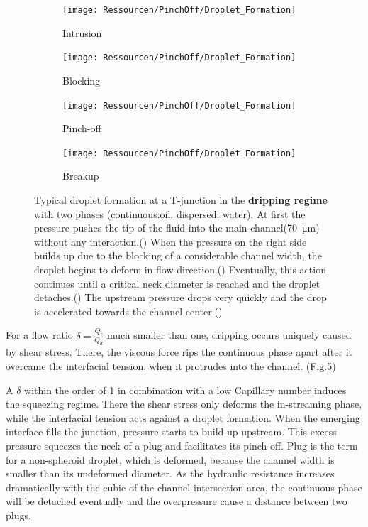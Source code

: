 \begin{figure}[htb]
	\begin{subfigure}{0.49\linewidth}
		\centering
		\texttt{[image: Ressourcen/PinchOff/Droplet\_Formation]}
		\caption{Intrusion}
		\label{fig:fluidics:droplet:dripping:intrusion}
	\end{subfigure}
	\hfil
	\begin{subfigure}{0.49\linewidth}
		\centering
		\texttt{[image: Ressourcen/PinchOff/Droplet\_Formation]}
		\caption{Blocking}
		\label{fig:fluidics:droplet:dripping:blocking}
	\end{subfigure}
	\vfil
	\begin{subfigure}{0.49\linewidth}
		\centering
		\texttt{[image: Ressourcen/PinchOff/Droplet\_Formation]}
		\caption{Pinch-off}
		\label{fig:fluidics:droplet:dripping:pinchoff}
	\end{subfigure}
	\hfil
	\begin{subfigure}{0.49\linewidth}
		\centering
		\texttt{[image: Ressourcen/PinchOff/Droplet\_Formation]}
		\caption{Breakup}
		\label{fig:fluidics:droplet:dripping:breakup}
	\end{subfigure}
	
	\caption{Typical droplet formation at a T-junction in the \textbf{dripping regime} with two phases (continuous:oil, dispersed: water). At first the pressure pushes the tip of the fluid into the main channel(\SI{70}{\micro\meter}) without any interaction.(\protect{}) When the pressure on the right side builds up due to the blocking of a considerable channel width, the droplet begins to deform in flow direction.(\protect{}) Eventually, this action continues until a critical neck diameter is reached and the droplet detaches.(\protect {}) The upstream pressure drops very quickly and the drop is accelerated towards the channel center.(\protect{})}
	\label{fig:fluidics:droplet:dripping}
\end{figure}

For a flow ratio $\delta = \frac{Q_c}{Q_d}$ much smaller than one, dripping occurs uniquely caused by shear stress. There, the viscous force rips the continuous phase apart after it overcame the interfacial tension, when it protrudes into the channel. (Fig.\ref{fig:fluidics:droplet:dripping})

A $\delta$ within the order of 1 in combination with a low Capillary number induces the squeezing regime. There the shear stress only deforms the in-streaming phase, while the interfacial tension acts against a droplet formation. When the emerging interface fills the junction, pressure starts to build up upstream. This excess pressure squeezes the neck of a plug and facilitates its pinch-off.\cite{lit:fluidics:droplet:formation:transition} Plug is the term for a non-spheroid droplet, which is deformed, because the channel width is smaller than its undeformed diameter. As the hydraulic resistance increases dramatically with the cubic of the channel intersection area, the continuous phase will be detached eventually and the overpressure cause a distance between two plugs.\cite{lit:fluidics:BioMEMS}

